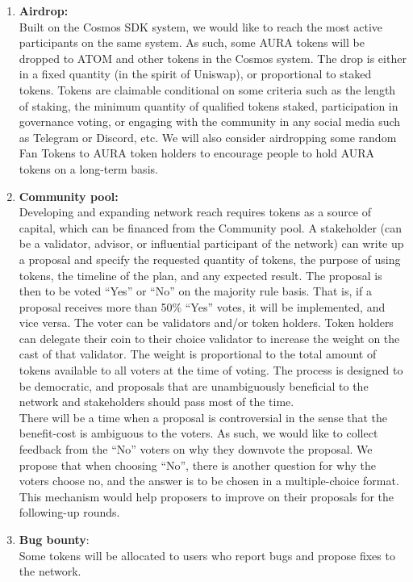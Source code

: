 \documentclass[11pt, titlepage]{article}
\begin{document}
\begin{enumerate}
\item \textbf{Airdrop:} \\ 
Built on the Cosmos SDK system, we would like to reach the most active participants on the same system. As such, some AURA tokens will be dropped to ATOM and other tokens in the Cosmos system. The drop is either in a fixed quantity (in the spirit of Uniswap), or proportional to staked tokens. Tokens are claimable conditional on some criteria such as the length of staking, the minimum quantity of qualified tokens staked, participation in governance voting, or engaging with the community in any social media such as Telegram or Discord, etc. We will also consider airdropping some random Fan Tokens to AURA token holders to encourage people to hold AURA tokens on a long-term basis.
\item \textbf{Community pool:} \\
Developing and expanding network reach requires tokens as a source of capital, which can be financed from the Community pool. A stakeholder (can be a validator, advisor, or influential participant of the network) can write up a proposal and specify the requested quantity of tokens, the purpose of using tokens, the timeline of the plan, and any expected result.  
The proposal is then to be voted “Yes” or “No” on the majority rule basis. That is, if a proposal receives more than 50\% “Yes” votes, it will be implemented, and vice versa. The voter can be validators and/or token holders. Token holders can delegate their coin to their choice validator to increase the weight on the cast of that validator. The weight is proportional to the total amount of tokens available to all voters at the time of voting. The process is designed to be democratic, and proposals that are unambiguously beneficial to the network and stakeholders should pass most of the time.\\
There will be a time when a proposal is controversial in the sense that the benefit-cost is ambiguous to the voters. As such, we would like to collect feedback from the “No” voters on why they downvote the proposal. We propose that when choosing “No”, there is another question for why the voters choose no, and the answer is to be chosen in a multiple-choice format. This mechanism would help proposers to improve on their proposals for the following-up rounds.
 
\item \textbf{Bug bounty}: \\ 
Some tokens will be allocated to users who report bugs and propose fixes to the network.

\end{enumerate}
\end{document}
